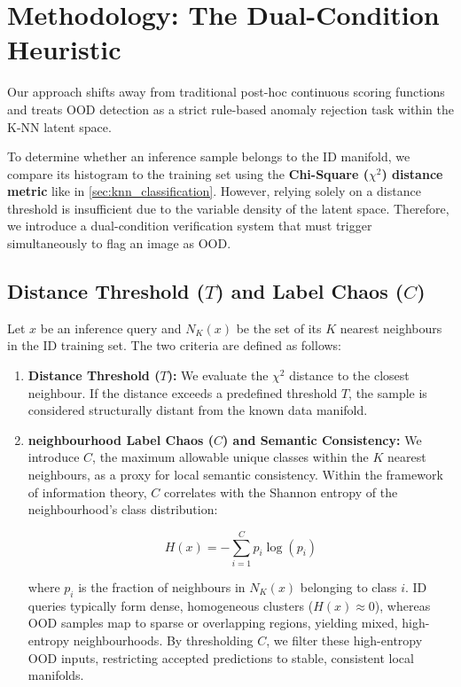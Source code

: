 \documentclass[oneside]{ctuthesis}
\begin{document}
\section{Methodology: The Dual-Condition Heuristic}
\label{sec:ood_methodology}
Our approach shifts away from traditional post-hoc continuous scoring functions and treats OOD detection as a strict rule-based anomaly rejection task within the K-NN latent space. 

To determine whether an inference sample belongs to the ID manifold, we compare its histogram to the training set using the \textbf{Chi-Square ($\chi^2$) distance metric} like in \ref{sec:knn_classification}. However, relying solely on a distance threshold is insufficient due to the variable density of the latent space. Therefore, we introduce a dual-condition verification system that must trigger simultaneously to flag an image as OOD.

\subsection{Distance Threshold ($T$) and Label Chaos ($C$)}
\label{sec:distance_threshold_and_label_chaos}

Let $x$ be an inference query and $N_K(x)$ be the set of its $K$ nearest neighbours in the ID training set. The two criteria are defined as follows:

\begin{enumerate}
    \item \textbf{Distance Threshold ($T$):} We evaluate the $\chi^2$ distance to the closest neighbour. If the distance exceeds a predefined threshold $T$, the sample is considered structurally distant from the known data manifold.
    \item \textbf{neighbourhood Label Chaos ($C$) and Semantic Consistency:} We introduce $C$, the maximum allowable unique classes within the $K$ nearest neighbours, as a proxy for local semantic consistency. Within the framework of information theory, $C$ correlates with the Shannon entropy of the neighbourhood's class distribution:
    
    $$H(x) = - \sum_{i=1}^{C} p_i \log(p_i)$$
    
    where $p_i$ is the fraction of neighbours in $N_K(x)$ belonging to class $i$. ID queries typically form dense, homogeneous clusters ($H(x) \approx 0$), whereas OOD samples map to sparse or overlapping regions, yielding mixed, high-entropy neighbourhoods. By thresholding $C$, we filter these high-entropy OOD inputs, restricting accepted predictions to stable, consistent local manifolds.
\end{enumerate}
\end{document}
